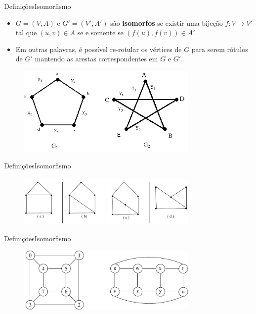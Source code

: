 \documentclass[aspectratio=169]{beamer}
\begin{document}

\begin{frame}{Definições}{Isomorfismo}
\begin{itemize}
\item $G = (V, A)$ e $G' = (V' , A')$ são {\bf isomorfos} se existir uma bijeção $f : V \rightarrow V'$ tal que $(u, v) \in A$ se e somente se $(f (u), f (v)) \in A'$.
\item Em outras palavras, é possível re-rotular os vértices de $G$ para serem rótulos de $G'$ mantendo as arestas correspondentes em $G$ e $G'$.
\end{itemize}
\begin{figure}[!h]
  \centering
  \includegraphics[width=250pt]{imagens/exemplo_isomorfismo1.png}
  \label{fig_exemplo_isomorfismo1}
\end{figure}
\end{frame}


\begin{frame}{Definições}{Isomorfismo}
\begin{figure}[!h]
  \centering
  \includegraphics[width=250pt]{imagens/exemplo_isomorfismo2.jpg}
  \label{fig_exemplo_isomorfismo2}
\end{figure}
\end{frame}


\begin{frame}{Definições}{Isomorfismo}
\begin{figure}[!h]
  \centering
  \includegraphics[width=250pt]{imagens/exemplo_isomorfismo3.png}
  \label{fig_exemplo_isomorfismo3}
\end{figure}
\end{frame}
\end{document}
